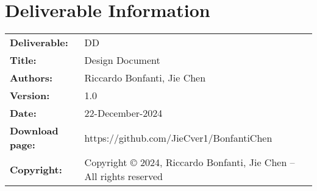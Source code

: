 \documentclass{util/polimi_3i}
\begin{document}


\pagestyle{empty} %
\frontmatter %




\startpreamble %
\setcounter{page}{1} %

\chapter*{Deliverable Information} 
\begin{table}[h!]
    \begin{tabu} to \textwidth { X[0.3,r,p] X[0.7,l,p] }
    \hline
    \textbf{Deliverable:} & DD\\
    \textbf{Title:} & Design Document \\
    \textbf{Authors:} & Riccardo Bonfanti, Jie Chen \\
    \textbf{Version:} & 1.0 \\ 
    \textbf{Date:} & 22-December-2024 \\
    \textbf{Download page:} & https://github.com/JieCver1/BonfantiChen \\
    \textbf{Copyright:} & Copyright © 2024, Riccardo Bonfanti, Jie Chen – All rights reserved \\
    \hline
    \end{tabu}
    \end{table}
    
\end{document}
